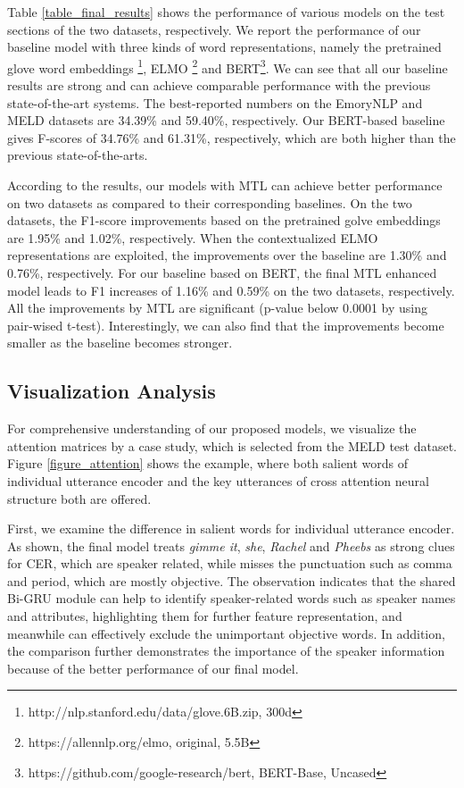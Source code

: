 \documentclass{article}
\begin{document}
\begin{CJK}{UTF8}{gbsn}
Table \ref{table_final_results} shows the performance of various models on the test sections of the two datasets, respectively. 
We report the performance of our baseline model with three kinds of word representations, 
namely the pretrained glove word embeddings \cite{Pennington2014glove} \footnote{http://nlp.stanford.edu/data/glove.6B.zip, 300d}, ELMO \cite{peters2018deep}\footnote{https://allennlp.org/elmo, original, 5.5B} and BERT\footnote{https://github.com/google-research/bert, BERT-Base, Uncased}.
We can see that all our baseline results are strong and can achieve comparable performance with the previous state-of-the-art systems.
The best-reported numbers on the EmoryNLP and MELD datasets are 34.39\% and 59.40\%, respectively.
Our BERT-based baseline gives F-scores of 34.76\% and 61.31\%, respectively,
which are both higher than the previous state-of-the-arts. 

According to the results, our models with MTL can achieve better performance on two datasets as compared to their corresponding baselines. 
On the two datasets, the F1-score improvements based on the pretrained golve embeddings are 1.95\% and 1.02\%, respectively. 
When the contextualized ELMO representations are exploited, the improvements over the baseline are 1.30\% and 0.76\%, respectively.
For our baseline based on BERT, 
the final MTL enhanced model leads to F1 increases of 1.16\% and 0.59\% on the two datasets, respectively.
All the improvements by MTL are significant (p-value below 0.0001 by using pair-wised t-test).
Interestingly, we can also find that the improvements become smaller as the baseline becomes stronger.












\subsection{Visualization Analysis}
For comprehensive understanding of our proposed models, we visualize the attention matrices by a case study, which is selected from the MELD test dataset. 
Figure \ref{figure_attention} shows the example, where both salient words of individual utterance encoder and the key utterances of cross attention neural structure both are offered.

First, we examine the difference in salient words for individual utterance encoder.
As shown, the final model treats \textit{gimme it}, \textit{she}, \textit{Rachel}  and \textit{Pheebs} as strong clues for CER,
which are speaker related, 
while misses the punctuation such as comma and period,
which are mostly objective.
The observation indicates that the shared Bi-GRU module can help to identify speaker-related words such as speaker names and attributes, highlighting them for further feature representation,
and meanwhile can effectively exclude the unimportant objective words.
In addition, the comparison further demonstrates the importance of the speaker information because of the better performance of our final model.


\end{CJK}
\end{document}
